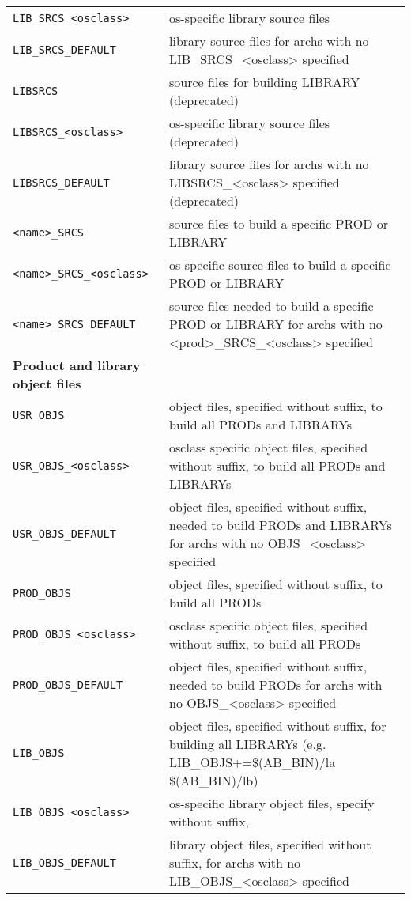 \begin{center}
\begin{longtable}{p{2.94784in}p{3.76247in}}
\verb|LIB_SRCS_<osclass>| & os-specific library source files\\
\verb|LIB_SRCS_DEFAULT| & library source files for archs with no LIB\_SRCS\_\textless{}osclass\textgreater{} specified\\
\verb|LIBSRCS| & source files for building LIBRARY (deprecated)\\
\verb|LIBSRCS_<osclass>| & os-specific library source files (deprecated)\\
\verb|LIBSRCS_DEFAULT| & library source files for archs with no LIBSRCS\_\textless{}osclass\textgreater{} specified (deprecated)\\
\verb|<name>_SRCS| & source files to build a specific PROD or LIBRARY\\
\verb|<name>_SRCS_<osclass>| & os specific source files to build a specific PROD or LIBRARY\\
\verb|<name>_SRCS_DEFAULT| & source files needed to build a specific PROD or LIBRARY for archs with no \textless{}prod\textgreater{}\_SRCS\_\textless{}osclass\textgreater{} specified\\
\textbf{Product and library object files} & \\
\hline
\verb|USR_OBJS| & object files, specified without suffix, to build all PRODs and LIBRARYs\\
\verb|USR_OBJS_<osclass>| & osclass specific object files, specified without suffix, to build all PRODs and LIBRARYs\\
\verb|USR_OBJS_DEFAULT| & object files, specified without suffix, needed to build PRODs and LIBRARYs for archs with no OBJS\_\textless{}osclass\textgreater{} specified\\
\verb|PROD_OBJS| & object files, specified without suffix, to build all PRODs\\
\verb|PROD_OBJS_<osclass>| & osclass specific object files, specified without suffix, to build all PRODs\\
\verb|PROD_OBJS_DEFAULT| & object files, specified without suffix, needed to build PRODs for archs with no OBJS\_\textless{}osclass\textgreater{} specified\\
\verb|LIB_OBJS| & object files, specified without suffix, for building all LIBRARYs (e.g. LIB\_OBJS+=\$(AB\_BIN)/la \$(AB\_BIN)/lb)\\
\verb|LIB_OBJS_<osclass>| & os-specific library object files, specify without suffix,\\
\verb|LIB_OBJS_DEFAULT| & library object files, specified without suffix, for archs with no LIB\_OBJS\_\textless{}osclass\textgreater{} specified\\

\end{longtable}
\end{center}
